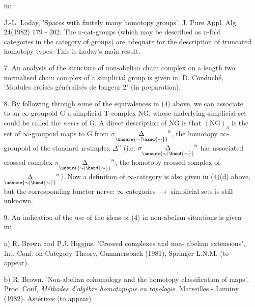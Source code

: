 
in:

J.-L. Loday, 'Spaces with finitely many homotopy groups', J. Pure
Appl. Alg.  24(1982) 179 - 202.
The n-cat-groups (which may be described as n-fold categories in
the category of groups) are adequate for the description of
truncated homotopy types.  This is Loday's main result.

7. An analysis of the structure of non-abelian chain complex on a
length two normalised chain complex of a simplicial group is
given in:
D. Conduché, 'Modules croisés généralisés de longeur 2' (in
preparation).

8. By following through some of the equivalences in (4) above, we
can associate to an $\infty$-groupoid G \quad a simplicial T-complex NG, whose
underlying simplicial set could be called the \textit{nerve} of G.  A
direct description of NG is that $(\mathrm{NG})_{n}$ is the set of
$\infty$-groupoid maps  to G from $\sigma\underset{\unsure{\sim|\hand{\sim}}}{\Delta}^{n}$, the homotopy $\infty$-groupoid of the
standard n-simplex $\Delta^{n}$ (i.e. $\sigma\underset{\unsure{\sim|\hand{\sim}}}{\Delta}^{n}$ has associated crossed complex $\pi\underset{\unsure{\sim|\hand{\sim}}}{\Delta}^{n}$,
the homotopy crossed complex of $\underset{\unsure{\sim|\hand{\sim}}}{\Delta}^{n}$).
Now a definition of $\infty$-category is also given in (4)(d) above,
but the corresponding functor nerve: $\infty$-categories $\longrightarrow$ simplicial
sets is still  unknown.

9. An indication of the use of the ideas of (4) in non-abelian
situations is given in:

a) R. Brown and P.J. Higgins, 'Crossed complexes and non-%
abelian extensions', Int. Conf. on Category Theory, Gummersbach
(1981),  Springer L.N.M. (to appear).

b) R. Brown, 'Non-abelian cohomology and the homotopy classification
of maps', Proc. Conf, \textit{Méthodes d'algèbre homotopique en topologie},
Marseilles - Luminy (1982).  Astérixes (to appear)

